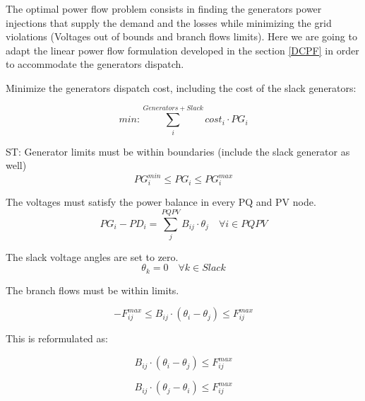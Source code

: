 \documentclass[nols,a4paper,twoside,notoc,fleqn]{tufte-book}
\begin{document}
The optimal power flow problem consists in finding the generators power injections that supply the demand and the losses while minimizing the grid violations (Voltages out of bounds and branch flows limits). Here we are going to adapt the linear power flow formulation developed in the section \ref{DCPF} in order to accommodate the generators dispatch.

Minimize the generators dispatch cost, including the cost of the slack generators:

\begin{equation}
min: \sum_i^{Generators+Slack} cost_i \cdot PG_i 
\end{equation}

ST: 
Generator limits must be within boundaries (include the slack generator as well)
\begin{equation}
PG_i^{min} \leq PG_i \leq PG_i^{max}
\end{equation}


The voltages must satisfy the power balance in every PQ and PV node.
\begin{equation}
PG_i - PD_i=\sum_j^{PQPV} B_{ij} \cdot \theta_j  \quad  \forall i \in PQPV
\end{equation}



The slack voltage angles are set to zero.
\begin{equation}
\theta_k=0   \quad \forall k \in Slack
\end{equation}


The branch flows must be within limits.

\begin{equation}
-F_{ij}^{max} \leq B_{ij}⋅(\theta_i - \theta_j) \leq F_{ij}^{max}
\end{equation}


This is reformulated as:

\begin{equation}
 B_{ij}⋅(\theta_i - \theta_j) \leq F_{ij}^{max}
\end{equation}

\begin{equation}
 B_{ij}⋅(\theta_j - \theta_i) \leq F_{ij}^{max}
\end{equation}
\end{document}
